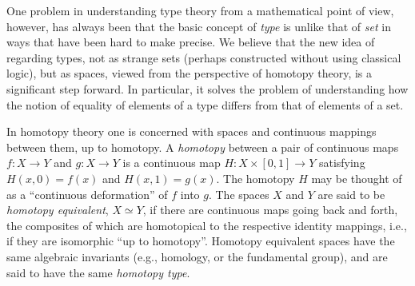 \documentclass[12pt]{article}
\newcommand{\eqv}[2]{\ensuremath{#1 \simeq #2}\xspace}
\begin{document}
One problem in understanding type theory from a mathematical point of view, however, has always been that the basic concept of \emph{type} is unlike that of \emph{set} in ways that have been hard to make precise.  We believe that the new idea of regarding types, not as strange sets (perhaps constructed without using classical logic), but as spaces, viewed from the perspective of homotopy theory, is a significant step forward.  In particular, it solves the problem of understanding how the notion of equality of elements of a type differs from that of elements of a set.

In homotopy theory one is concerned with spaces
%
and continuous mappings between them, 
%
up to homotopy.  A \emph{homotopy}
%
between a pair of continuous maps $f : X \to Y$
and  $g : X\to Y$ is 
a continuous map $H : X \times [0, 1] \to Y$ satisfying
$H(x, 0) = f (x)$  and $H(x, 1) = g(x)$. The homotopy $H$ may be thought of as a ``continuous deformation'' of $f$ into $g$. The spaces $X$ and $Y$ are said to be \emph{homotopy equivalent},
%
$\eqv X Y$, if there are continuous maps going back and forth, the composites of which are homotopical to the respective identity mappings, i.e., if they are isomorphic ``up to homotopy''.  Homotopy equivalent spaces have the same algebraic invariants (e.g., homology, or the fundamental group), and are said to have the same \emph{homotopy type}.
\end{document}
